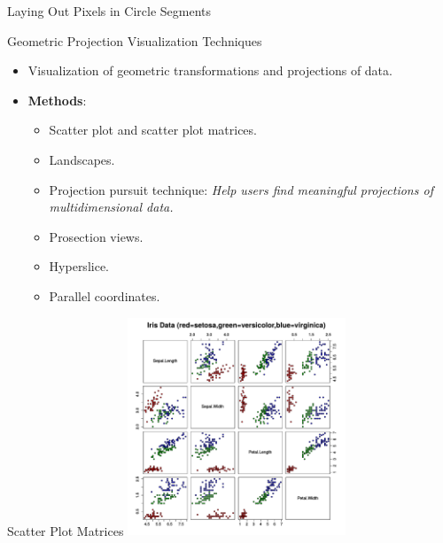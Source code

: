 \begin{frame}{Laying Out Pixels in Circle Segments}
\end{frame}

\begin{frame}{Geometric Projection Visualization Techniques}
  \begin{itemize}
  \item Visualization of geometric transformations and projections of data.
  \item \textbf{Methods}:
    \begin{itemize}
    \item Scatter plot and scatter plot matrices.
    \item Landscapes.
    \item Projection pursuit technique: \emph{Help users find meaningful projections of multidimensional data.}
    \item Prosection views.
    \item Hyperslice.
    \item Parallel coordinates.
    \end{itemize}
  \end{itemize}
\end{frame}

\begin{frame}{Scatter Plot Matrices}
  \centering
  \includegraphics[height=6.5cm]{img/scatterplot_matrix.pdf}
\end{frame}

